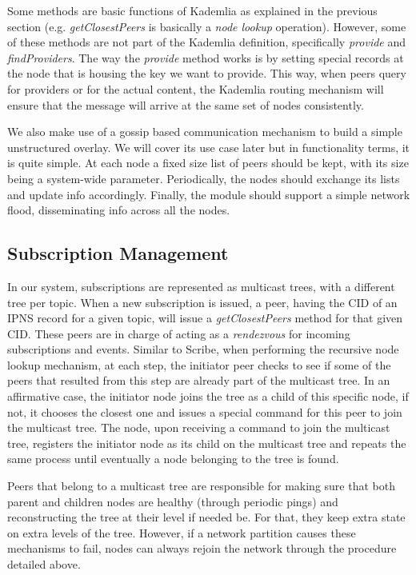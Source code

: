 Some methods are basic functions of Kademlia as explained in the
previous section (e.g. \emph{getClosestPeers} is basically a \emph{node
lookup} operation). However, some of these methods are not part of the
Kademlia definition, specifically \emph{provide} and
\emph{findProviders}. The way the \emph{provide} method works is by
setting special records at the node that is housing the key we want to
provide. This way, when peers query for providers or for the actual
content, the Kademlia routing mechanism will ensure that the message
will arrive at the same set of nodes consistently.

We also make use of a gossip based communication mechanism to build a
simple unstructured overlay. We will cover its use case later but in
functionality terms, it is quite simple. At each node a fixed size list
of peers should be kept, with its size being a system-wide parameter.
Periodically, the nodes should exchange its lists and update info
accordingly. Finally, the module should support a simple network flood,
disseminating info across all the nodes.

\subsection{Subscription Management}\label{subscription-management}

In our system, subscriptions are represented as multicast trees, with a
different tree per topic. When a new subscription is issued, a peer,
having the CID of an IPNS record for a given topic, will issue a
\emph{getClosestPeers} method for that given CID. These peers are in
charge of acting as a \emph{rendezvous} for incoming subscriptions and
events. Similar to Scribe, when performing the recursive node lookup
mechanism, at each step, the initiator peer checks to see if some of the
peers that resulted from this step are already part of the multicast
tree. In an affirmative case, the initiator node joins the tree as a
child of this specific node, if not, it chooses the closest one and
issues a special command for this peer to join the multicast tree. The
node, upon receiving a command to join the multicast tree, registers the
initiator node as its child on the multicast tree and repeats the
same process until eventually a node belonging to the tree is found.

Peers that belong to a multicast tree are responsible for making sure
that both parent and children nodes are healthy (through periodic pings)
and reconstructing the tree at their level if needed be. For that, they
keep extra state on extra levels of the tree. However, if a network
partition causes these mechanisms to fail, nodes can always rejoin the
network through the procedure detailed above.


